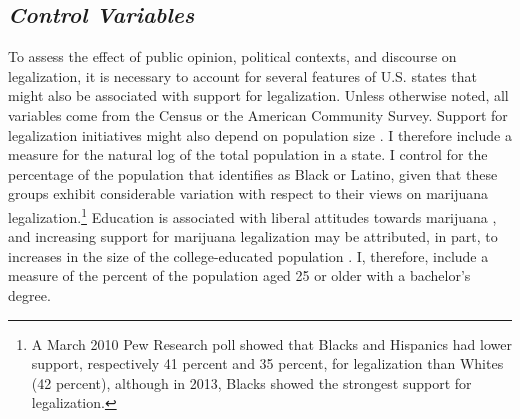 

\subsection{\it{Control Variables}}

To assess the effect of public opinion, political contexts, and discourse on legalization, it is necessary to account for several features of U.S. states that might also be associated with support for legalization. Unless otherwise noted, all variables come from the Census or the American Community Survey. %
Support for legalization initiatives might also depend on population size \citep{soule_and_olzak_2004,soule_and_king_2006,boushey_2016}. I therefore include a measure for the natural log of the total population in a state. I control for the percentage of the population that identifies as Black or Latino, given that these groups exhibit considerable variation with respect to their views on marijuana legalization.\footnote{A March 2010 Pew Research poll showed that Blacks and Hispanics had lower support, respectively 41 percent and 35 percent, for legalization than Whites (42 percent), although in 2013, Blacks showed the strongest support for legalization.} Education is associated with liberal attitudes towards marijuana \citep{pedersen_2009}, and increasing support for marijuana legalization may be attributed, in part, to increases in the size of the college-educated population \citep{rosenthal_and_kubby_1996}. I, therefore, include a measure of the percent of the population aged 25 or older with a bachelor's degree. %

